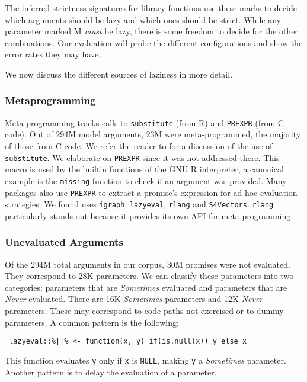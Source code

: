 \documentclass[review,nonacm,screen,acmsmall,anonymous=true]{acmart}
\newcommand{\sometimes}{\emph{Sometimes}\xspace}
\newcommand{\never}{\emph{Never}\xspace}
\newcommand{\code}[1]{\lstinline |#1|\xspace}
\begin{document}
The inferred strictness signatures for library functions use these marks to
decide which arguments should be lazy and which ones should be strict. While any
parameter marked M \emph{must} be lazy, there is some freedom to decide for the
other combinations. Our evaluation will probe the different configurations and
show the error rates they may have.

\medskip

We now discuss the different sources of laziness in more detail.

\subsubsection{Metaprogramming}

Meta-programming tracks calls to \code{substitute} (from R) and \code{PREXPR}
(from C code). Out of 294M model arguments, 23M were meta-programmed, the
majority of those from C code. We refer the reader to \cite{oopsla19b} for a
discussion of the use of \code{substitute}. We elaborate on \code{PREXPR} since
it was not addressed there. This macro is used by the builtin functions of the
GNU R interpreter, a canonical example is the \code{missing} function to check
if an argument was provided. Many packages also use \code{PREXPR} to extract a
promise's expression for ad-hoc evaluation strategies. We found uses
\code{igraph}, \code{lazyeval}, \code{rlang} and \code{S4Vectors}. \code{rlang}
particularly stands out because it provides its own API for meta-programming.

\subsubsection{Unevaluated Arguments}

Of the 294M total arguments in our corpus, 30M promises were not evaluated. They
correspond to 28K parameters. We can classify these parameters into two
categories: parameters that are \sometimes evaluated and parameters that are
\never evaluated. There are 16K \sometimes parameters and 12K \never parameters.
These may correspond to code paths not exercised or to dummy parameters.
%
A common pattern is the following:
%
\begin{lstlisting}
 lazyeval::%||% <- function(x, y) if(is.null(x)) y else x
\end{lstlisting}
%
This function evaluates \code{y} only if \code{x} is \code{NULL}, making
\code{y} a \sometimes parameter.
\noindent
Another pattern is to delay the evaluation of a parameter.
\end{document}
